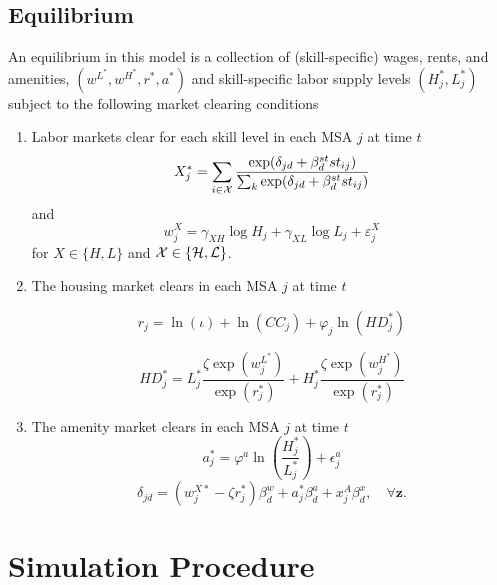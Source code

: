 \documentclass{article}
\begin{document}
\subsection{Equilibrium}
An equilibrium in this model is a collection of (skill-specific) wages, rents, and amenities, $(w^{L^*},w^{H^*},r^*,a^*)$ and skill-specific labor supply levels $(H_{j}^*,L_{j}^*)$ subject to the following market clearing conditions 
\begin{enumerate}
\item Labor markets clear for each skill level in each MSA $j$ at time $t$ 
$$ X_{j}^*  = \sum_{i\in\mathcal{X}} \frac{\exp(\delta_{jd} + \beta_d^{st}st_{ij})}{\sum_{k} \exp(\delta_{jd} + \beta_d^{st}st_{ij})}$$
and 
$$w_{j}^X = \gamma_{X H}\log H_{j} + \gamma_{X L} \log L_{j} + \varepsilon_{j}^X$$
for $X \in \{H, L\}$ and $\mathcal{X} \in \{\mathcal{H}, \mathcal{L}\}$. 
\item The housing market clears in each MSA $j$ at time $t$

$$ r_{j} = \ln(\iota) + \ln(CC_{j}) + \varphi_j\ln (HD^*_{j})$$

$$ HD_{j}^* = L_{j}^* \frac{\zeta \exp(w_{j}^{L^*})}{\exp(r_{j}^*)} + H_{j}^* \frac{\zeta \exp(w_{j}^{H^*})}{\exp(r_{j}^*)}$$

\item The amenity market clears in each MSA $j$ at time $t$
$$a_{j}^* = \varphi^a \ln\left(\frac{H_{j}^*}{L_{j}^*}\right) + \epsilon_{j}^a$$
$$\delta_{jd} = (w^{X*}_{j} - \zeta r_{j}^*)\beta^w_d + a_{j}^* \beta^a_d + x_{j}^A\beta^x_d, \quad \forall \bm{z}.$$
\end{enumerate}

\section{Simulation Procedure}
\end{document}

